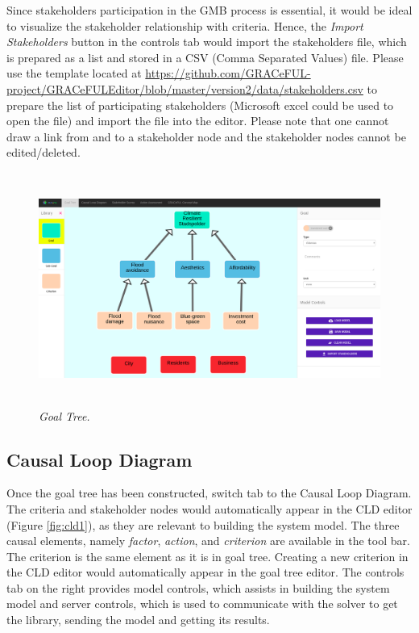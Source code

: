 \documentclass[a4paper]{article}
\begin{document}
Since stakeholders participation in the GMB process is essential, it would be ideal to visualize the stakeholder relationship with criteria. Hence, the \textit{Import Stakeholders} button in the controls tab would import the stakeholders file, which is prepared as a list and stored in a CSV (Comma Separated Values) file. Please use the template located at \url{https://github.com/GRACeFUL-project/GRACeFULEditor/blob/master/version2/data/stakeholders.csv} to prepare the list of participating stakeholders (Microsoft excel could be used to open the file) and import the file into the editor. Please note that one cannot draw a link from and to a stakeholder node and the stakeholder nodes cannot be edited/deleted.

\begin{figure}
\begin{center}
\includegraphics[height=3in,width=5in]{img/goal_tree.png}
\caption{\small \sl Goal Tree.\label{fig:goal_tree}}
\end{center}
\end{figure}

\subsection{Causal Loop Diagram}

Once the goal tree has been constructed, switch tab to the Causal Loop Diagram. The criteria and stakeholder nodes would automatically appear in the CLD editor (Figure \ref{fig:cld1}), as they are relevant to building the system model. The three causal elements, namely \textit{factor}, \textit{action}, and \textit{criterion} are available in the tool bar. The criterion is the same element as it is in goal tree. Creating a new criterion in the CLD editor would automatically appear in the goal tree editor. The controls tab on the right provides model controls, which assists in building the system model and server controls, which is used to communicate with the solver to get the library, sending the model and getting its results.
\end{document}
